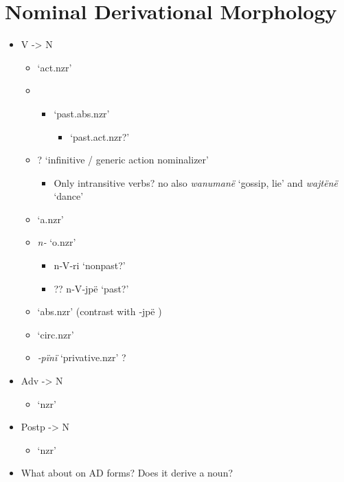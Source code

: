 \documentclass{memoir}
\begin{document}
\section{\texorpdfstring{Nominal Derivational Morphology
\label{sec:nounderiv}}{Nominal Derivational Morphology }}

\begin{itemize}
\tightlist
\item
  V -\textgreater{} N

  \begin{itemize}
  \item
     `act.nzr'
  \item

    \begin{itemize}
    \tightlist
    \item
      `past.abs.nzr'

      \begin{itemize}
      \tightlist
      \item
        `past.act.nzr?'
      \end{itemize}
    \end{itemize}
  \item
    ? `infinitive / generic action nominalizer'

    \begin{itemize}
    \tightlist
    \item
      Only intransitive verbs? no also \emph{wanumanë} `gossip, lie' and
      \emph{wajtënë} `dance'
    \end{itemize}
  \item
     `a.nzr'
  \item
    \emph{n‑} `o.nzr'

    \begin{itemize}
    \tightlist
    \item
      n‑V‑ri `nonpast?'
    \item
      ?? n‑V‑jpë `past?'
    \end{itemize}
  \item
     `abs.nzr' (contrast with ‑jpë )
  \item
     `circ.nzr'
  \item
    \emph{‑pïnï} `privative.nzr' ?
  \end{itemize}
\item
  Adv -\textgreater{} N

  \begin{itemize}
  \tightlist
  \item
     `nzr'
  \end{itemize}
\item
  Postp -\textgreater{} N

  \begin{itemize}
  \tightlist
  \item
     `nzr'
  \end{itemize}
\item
  What about  on AD forms? Does it derive a noun?
\end{itemize}
\end{document}

